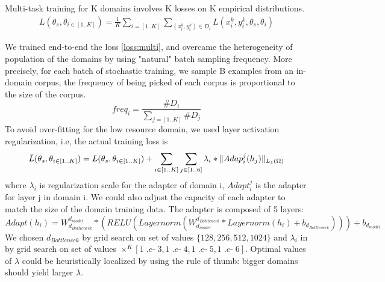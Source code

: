 \documentclass[12pt,a4paper,twoside]{report}
\theoremstyle{definition}
\newcommand\minus{\mathop{\mbox{$\mathit{.e}$-}}}
\begin{document}
Multi-task training for K domains involves K losses on K empirical distributions. 
\begin{equation}
\begin{split}
L(\theta_{s},\theta_{i \in [1..K]}) = \frac{1}{K} \displaystyle{\mathop{\sum}_{i=[1..K]} \mathop{\sum}_{(x_i^{k},y_i^{k}) \in D_i}L(x_i^{k},y_i^{k},\theta_s,\theta_i)}
\end{split}
\label{loss:multi}
\end{equation}

We trained end-to-end the loss \ref{loss:multi}, and overcame the heterogeneity of population of the domains by using "natural" batch sampling frequency. More precisely, for each batch of stochastic training, we sample B examples from an in-domain corpus, the frequency of being picked of each corpus is proportional to the size of the corpus.
$$freq_i = \frac{\#D_i}{\displaystyle{\mathop{\sum}_{j=[1..K]}\#D_j}}$$
To avoid over-fitting for the low resource domain, we used layer activation regularization, i.e, the actual training loss is 
\begin{equation}
\begin{split}
\bar{L}(\theta_{s},\theta_{i \in [1..K]}) = L(\theta_{s},\theta_{i \in [1..K]}) + \displaystyle{\mathop{\sum}_{i \in [1..K]} \mathop{\sum}_{j \in [1..6]} \lambda_i * \normL{Adap^{j}_i(h_j)}}
\end{split}
\label{loss:multi-reg}
\end{equation}
where $\lambda_i$ is regularization scale for the adapter of domain i, $Adapt^j_i$ is the adapter for layer j in domain i. We could also adjust the capacity of each adapter to match the size of the domain training data. The adapter is composed of 5 layers:
$$Adapt(h_i) = W^{d_{model}}_{d_{Bottleneck}} * (RELU( Layernorm ( W^{d_{Bottleneck}}_{d_{model}} * Layernorm(h_i) + b_{d_{Bottleneck}} ) )) + b_{d_{model}}$$
We chosen $d_{Bottleneck}$ by grid search on set of values $\{128, 256,512,1024\}$ and $\lambda_i$ in by grid search on set of values $\times^{K}[1\minus{3}, 1\minus{4},1\minus{5},1\minus{6}]$. Optimal values of $\lambda$ could be heuristically localized by using the rule of thumb: bigger domains should yield larger $\lambda$.
\end{document}
